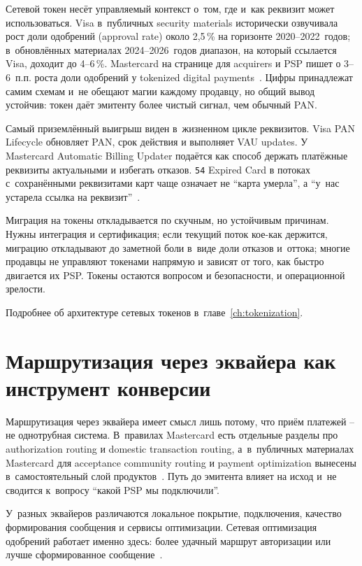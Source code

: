 Сетевой токен несёт управляемый контекст о~том, где и~как реквизит
может использоваться. Visa в~публичных security materials
исторически озвучивала рост доли одобрений (approval rate) около
2,5\,\% на горизонте 2020--2022~годов; в~обновлённых материалах
2024--2026~годов диапазон, на который ссылается Visa, доходит
до 4--6\,\%. Mastercard на странице для acquirers и PSP пишет
о 3--6~п.п. роста доли одобрений у tokenized digital
payments~\cite{visa-tokenization-security,mc-acquirers-psps}. Цифры
принадлежат самим схемам и~не обещают магии каждому продавцу, но
общий вывод устойчив: токен даёт эмитенту более чистый сигнал,
чем обычный PAN.

Самый приземлённый выигрыш виден в~жизненном цикле реквизитов. Visa PAN
Lifecycle обновляет PAN, срок действия и выполняет VAU
updates. У Mastercard Automatic Billing Updater подаётся как способ
держать платёжные реквизиты актуальными и избегать отказов.
\texttt{54} Expired Card в потоках с~сохранёнными реквизитами карт чаще означает не
\enquote{карта умерла}, а \enquote{у~нас устарела ссылка на
реквизит}~\cite{visa-vts,visa-vau,mc-bill-pay-solutions}.

Миграция на токены откладывается по скучным, но устойчивым причинам.
Нужны интеграция и сертификация; если текущий поток кое-как держится,
миграцию откладывают до заметной боли в~виде доли отказов и~оттока;
многие продавцы не управляют токенами напрямую и
зависят от того, как быстро двигается их PSP. Токены остаются
вопросом и безопасности, и операционной зрелости.

Подробнее об архитектуре сетевых токенов в~главе~\ref{ch:tokenization}.

\section{Маршрутизация через эквайера как инструмент конверсии}\label{sec:decline-routing}

Маршрутизация через эквайера имеет смысл лишь потому, что приём
платежей -- не однотрубная система. В~правилах Mastercard есть
отдельные разделы про authorization routing и domestic transaction
routing, а~в~публичных материалах Mastercard для acceptance community
routing и payment optimization вынесены в~самостоятельный слой
продуктов~\cite{mc-tpr,mc-acquirers-psps,mc-pop}.
Путь до эмитента влияет на исход и~не сводится к~вопросу
\enquote{какой PSP мы подключили}.

У~разных эквайеров различаются локальное покрытие, подключения, качество
формирования сообщения и сервисы оптимизации. Сетевая оптимизация
одобрений работает именно здесь: более удачный маршрут авторизации или
лучше сформированное сообщение~\cite{mc-pop}.

